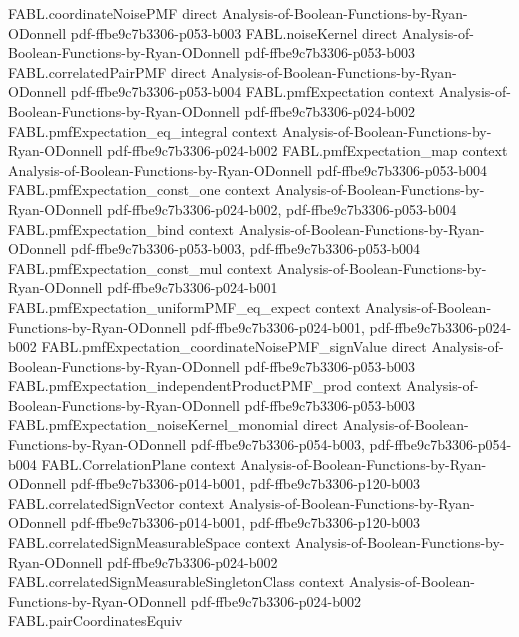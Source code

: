 \begin{theorem}
\proofstep
  {FABL.coordinateNoisePMF}
  {direct}
  {Analysis-of-Boolean-Functions-by-Ryan-ODonnell}
  {pdf-ffbe9c7b3306-p053-b003}
\proofstep
  {FABL.noiseKernel}
  {direct}
  {Analysis-of-Boolean-Functions-by-Ryan-ODonnell}
  {pdf-ffbe9c7b3306-p053-b003}
\proofstep
  {FABL.correlatedPairPMF}
  {direct}
  {Analysis-of-Boolean-Functions-by-Ryan-ODonnell}
  {pdf-ffbe9c7b3306-p053-b004}
\proofstep
  {FABL.pmfExpectation}
  {context}
  {Analysis-of-Boolean-Functions-by-Ryan-ODonnell}
  {pdf-ffbe9c7b3306-p024-b002}
\proofstep
  {FABL.pmfExpectation_eq_integral}
  {context}
  {Analysis-of-Boolean-Functions-by-Ryan-ODonnell}
  {pdf-ffbe9c7b3306-p024-b002}
\proofstep
  {FABL.pmfExpectation_map}
  {context}
  {Analysis-of-Boolean-Functions-by-Ryan-ODonnell}
  {pdf-ffbe9c7b3306-p053-b004}
\proofstep
  {FABL.pmfExpectation_const_one}
  {context}
  {Analysis-of-Boolean-Functions-by-Ryan-ODonnell}
  {pdf-ffbe9c7b3306-p024-b002,
    pdf-ffbe9c7b3306-p053-b004}
\proofstep
  {FABL.pmfExpectation_bind}
  {context}
  {Analysis-of-Boolean-Functions-by-Ryan-ODonnell}
  {pdf-ffbe9c7b3306-p053-b003,
    pdf-ffbe9c7b3306-p053-b004}
\proofstep
  {FABL.pmfExpectation_const_mul}
  {context}
  {Analysis-of-Boolean-Functions-by-Ryan-ODonnell}
  {pdf-ffbe9c7b3306-p024-b001}
\proofstep
  {FABL.pmfExpectation_uniformPMF_eq_expect}
  {context}
  {Analysis-of-Boolean-Functions-by-Ryan-ODonnell}
  {pdf-ffbe9c7b3306-p024-b001,
    pdf-ffbe9c7b3306-p024-b002}
\proofstep
  {FABL.pmfExpectation_coordinateNoisePMF_signValue}
  {direct}
  {Analysis-of-Boolean-Functions-by-Ryan-ODonnell}
  {pdf-ffbe9c7b3306-p053-b003}
\proofstep
  {FABL.pmfExpectation_independentProductPMF_prod}
  {context}
  {Analysis-of-Boolean-Functions-by-Ryan-ODonnell}
  {pdf-ffbe9c7b3306-p053-b003}
\proofstep
  {FABL.pmfExpectation_noiseKernel_monomial}
  {direct}
  {Analysis-of-Boolean-Functions-by-Ryan-ODonnell}
  {pdf-ffbe9c7b3306-p054-b003,
    pdf-ffbe9c7b3306-p054-b004}
\proofstep
  {FABL.CorrelationPlane}
  {context}
  {Analysis-of-Boolean-Functions-by-Ryan-ODonnell}
  {pdf-ffbe9c7b3306-p014-b001,
    pdf-ffbe9c7b3306-p120-b003}
\proofstep
  {FABL.correlatedSignVector}
  {context}
  {Analysis-of-Boolean-Functions-by-Ryan-ODonnell}
  {pdf-ffbe9c7b3306-p014-b001,
    pdf-ffbe9c7b3306-p120-b003}
\proofstep
  {FABL.correlatedSignMeasurableSpace}
  {context}
  {Analysis-of-Boolean-Functions-by-Ryan-ODonnell}
  {pdf-ffbe9c7b3306-p024-b002}
\proofstep
  {FABL.correlatedSignMeasurableSingletonClass}
  {context}
  {Analysis-of-Boolean-Functions-by-Ryan-ODonnell}
  {pdf-ffbe9c7b3306-p024-b002}
\proofstep
  {FABL.pairCoordinatesEquiv}

\end{theorem}
